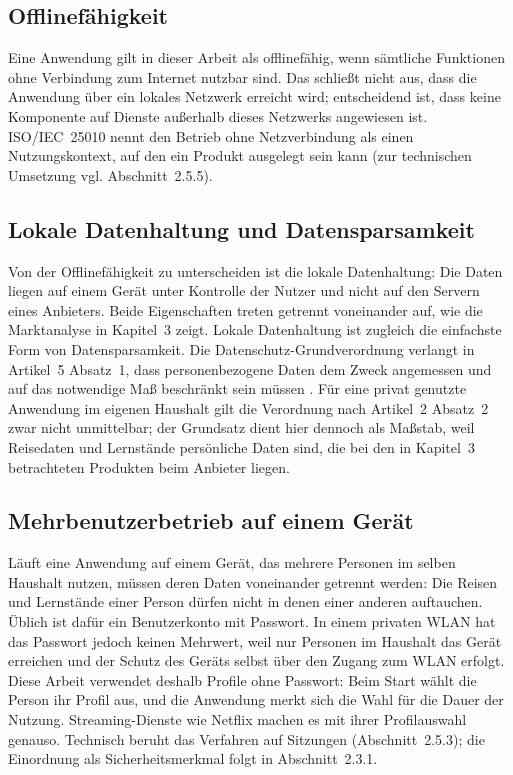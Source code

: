\documentclass[12pt,a4paper]{scrreprt}
\begin{document}
\subsection{Offlinefähigkeit}
Eine Anwendung gilt in dieser Arbeit als offlinefähig, wenn sämtliche Funktionen ohne Verbindung zum Internet nutzbar sind. Das schließt nicht aus, dass die Anwendung über ein lokales Netzwerk erreicht wird; entscheidend ist, dass keine Komponente auf Dienste außerhalb dieses Netzwerks angewiesen ist. ISO/IEC~25010 nennt den Betrieb ohne Netzverbindung als einen Nutzungskontext, auf den ein Produkt ausgelegt sein kann \cite[Abschn.~3.8]{iso25010} (zur technischen Umsetzung vgl. Abschnitt~2.5.5).

\subsection{Lokale Datenhaltung und Datensparsamkeit}
Von der Offlinefähigkeit zu unterscheiden ist die lokale Datenhaltung: Die Daten liegen auf einem Gerät unter Kontrolle der Nutzer und nicht auf den Servern eines Anbieters. Beide Eigenschaften treten getrennt voneinander auf, wie die Marktanalyse in Kapitel~3 zeigt. Lokale Datenhaltung ist zugleich die einfachste Form von Datensparsamkeit. Die Datenschutz-Grundverordnung verlangt in Artikel~5 Absatz~1, dass personenbezogene Daten dem Zweck angemessen und auf das notwendige Maß beschränkt sein müssen \cite{dsgvo}. Für eine privat genutzte Anwendung im eigenen Haushalt gilt die Verordnung nach Artikel~2 Absatz~2 zwar nicht unmittelbar; der Grundsatz dient hier dennoch als Maßstab, weil Reisedaten und Lernstände persönliche Daten sind, die bei den in Kapitel~3 betrachteten Produkten beim Anbieter liegen.

\subsection{Mehrbenutzerbetrieb auf einem Gerät}
Läuft eine Anwendung auf einem Gerät, das mehrere Personen im selben Haushalt nutzen, müssen deren Daten voneinander getrennt werden: Die Reisen und Lernstände einer Person dürfen nicht in denen einer anderen auftauchen. Üblich ist dafür ein Benutzerkonto mit Passwort. In einem privaten WLAN hat das Passwort jedoch keinen Mehrwert, weil nur Personen im Haushalt das Gerät erreichen und der Schutz des Geräts selbst über den Zugang zum WLAN erfolgt. Diese Arbeit verwendet deshalb Profile ohne Passwort: Beim Start wählt die Person ihr Profil aus, und die Anwendung merkt sich die Wahl für die Dauer der Nutzung. Streaming-Dienste wie Netflix machen es mit ihrer Profilauswahl genauso. Technisch beruht das Verfahren auf Sitzungen (Abschnitt~2.5.3); die Einordnung als Sicherheitsmerkmal folgt in Abschnitt~2.3.1.
\end{document}
